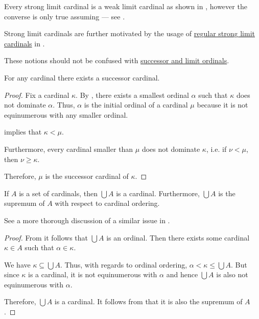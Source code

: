 \begin{definition}
\begin{thmenum}
    Every strong limit cardinal is a weak limit cardinal as shown in , however the converse is only true assuming  --- see .

    Strong limit cardinals are further motivated by the usage of \hyperref[rem:strongly_inaccessible_cardinal]{regular strong limit cardinals} in .
  \end{thmenum}

  These notions should not be confused with \hyperref[def:successor_and_limit_ordinal]{successor and limit ordinals}.
\end{definition}

\begin{proposition}\label{thm:successor_cardinal_existence}
  For any cardinal there exists a successor cardinal.
\end{proposition}
\begin{proof}
  Fix a cardinal \( \kappa \). By , there exists a smallest ordinal \( \alpha \) such that \( \kappa \) does not dominate \( \alpha \). Thus, \( \alpha \) is the initial ordinal of a cardinal \( \mu \) because it is not equinumerous with any smaller ordinal.

   implies that \( \kappa < \mu \).

  Furthermore, every cardinal smaller than \( \mu \) does not dominate \( \kappa \), i.e. if \( \nu < \mu \), then \( \nu \geq \kappa \).

  Therefore, \( \mu \) is the successor cardinal of \( \kappa \).
\end{proof}

\begin{proposition}\label{thm:union_of_set_of_cardinals}
  If \( A \) is a set of cardinals, then \( \bigcup A \) is a cardinal. Furthermore, \( \bigcup A \) is the supremum of \( A \) with respect to cardinal ordering.

  See a more thorough discussion of a similar issue in .
\end{proposition}
\begin{proof}
  From  it follows that \( \bigcup A \) is an ordinal. Then there exists some cardinal \( \kappa \in A \) such that \( \alpha \in \kappa \).

  We have \( \kappa \subseteq \bigcup A \). Thus, with regards to ordinal ordering, \( \alpha < \kappa \leq \bigcup A \). But since \( \kappa \) is a cardinal, it is not equinumerous with \( \alpha \) and hence \( \bigcup A \) is also not equinumerous with \( \alpha \).

  Therefore, \( \bigcup A \) is a cardinal. It follows from  that it is also the supremum of \( A \).
\end{proof}

